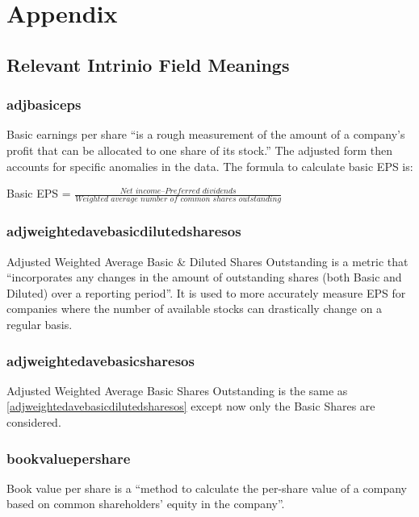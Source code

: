 \section{Appendix}
\subsection{Relevant Intrinio Field Meanings} \label{intrinioFields}
\subsubsection*{adjbasiceps}
Basic earnings per share ``is a rough measurement of the amount of a company's profit that can be allocated to one share of its stock.''\cite{basicEarnings} The adjusted form then accounts for specific anomalies in the data. The formula to calculate basic EPS is: \newline 

Basic EPS = $ \frac{Net \, \, income – Preferred \, \, dividends}{Weighted \, \, average \, \, number \, \, of \, \, common \, \, shares \, \, outstanding}$

\subsubsection*{adjweightedavebasicdilutedsharesos} \label{adjweightedavebasicdilutedsharesos}
Adjusted Weighted Average Basic \& Diluted Shares Outstanding is a metric that ``incorporates any changes in the amount of outstanding shares (both Basic and Diluted) over a reporting period''. It is used to more accurately measure EPS for companies where the number of available stocks can drastically change on a regular basis. \cite{weightedOutstandingShares}

\subsubsection*{adjweightedavebasicsharesos}
Adjusted Weighted Average Basic Shares Outstanding is the same as \ref{adjweightedavebasicdilutedsharesos} except now only the Basic Shares are considered.

\subsubsection*{bookvaluepershare}
Book value per share is a ``method to calculate the per-share value of a company based on common shareholders' equity in the company''. \newline


